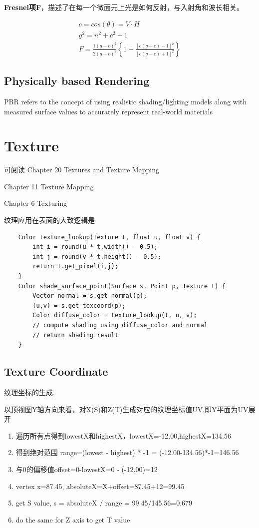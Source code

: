 \textbf{Fresnel项F}，描述了在每一个微面元上光是如何反射，与入射角和波长相关。
\newline

\begin{align*}
    c = cos(\theta) = V \cdot H \\
    g^2 = n^2 + c^2 - 1 \\
F = \frac{1(g-c)^2}{2(g+c)^2} \left\{ 1+\frac{[c(g+c)-1]^2}{[c(g-c)+1]^2} \right\}
\end{align*}

\section{Physically based Rendering}

PBR refers to the concept of using realistic shading/lighting models along with measured surface values to accurately represent real-world materials

\chapter{Texture}

可阅读
Chapter 20 Textures and Texture Mapping\cite{CGPP3ed}

Chapter 11 Texture Mapping\cite{FCG4ed}

Chapter 6 Texturing\cite{RTR4ed}

纹理应用在表面的大致逻辑是
\begin{lstlisting}
    Color texture_lookup(Texture t, float u, float v) {
        int i = round(u * t.width() - 0.5);
        int j = round(v * t.height() - 0.5);
        return t.get_pixel(i,j);
    }
    Color shade_surface_point(Surface s, Point p, Texture t) {
        Vector normal = s.get_normal(p);
        (u,v) = s.get_texcoord(p);
        Color diffuse_color = texture_lookup(t, u, v);
        // compute shading using diffuse_color and normal 
        // return shading result    
    }
\end{lstlisting}

\section{Texture Coordinate}
 纹理坐标的生成.

以顶视图Y轴方向来看，对X(S)和Z(T)生成对应的纹理坐标值UV,即Y平面为UV展开

\begin{enumerate}
    \item \textsf{遍历所有点得到lowestX和highestX，lowestX=-12.00,highestX=134.56}
    \item \textsf{得到绝对范围 range=(lowest - highest) * -1 = (-12.00-134.56)*-1=146.56}
    \item \textsf{与0的偏移值offset=0-lowestX=0 - (-12.00)=12}
    \item \textsf{vertex x=87.45, absoluteX=X+offset=87.45+12=99.45}
    \item \textsf{get S value, s = absoluteX / range = 99.45/145.56=0.679}
    \item \textsf{do the same for Z axis to get T value}
\end{enumerate}

